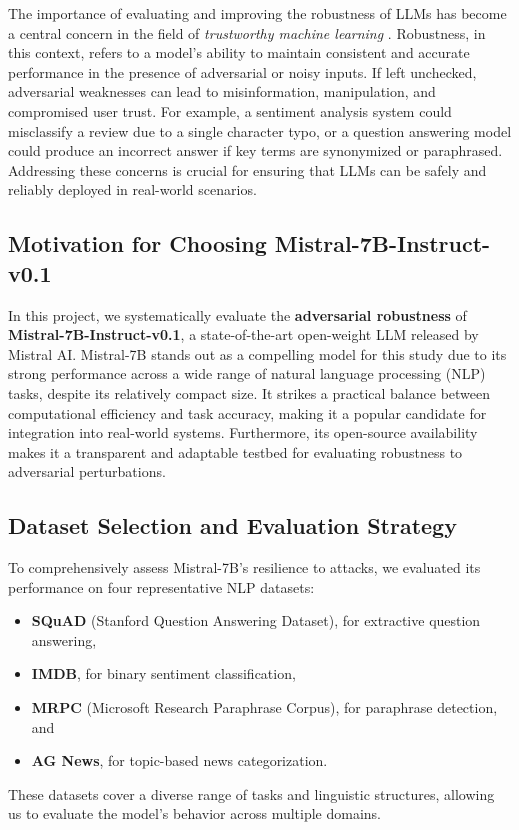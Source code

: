 \documentclass[conference]{IEEEtran}
\begin{document}
The importance of evaluating and improving the robustness of LLMs has become a central concern in the field of \textit{trustworthy machine learning} \cite{vitorino2024}. Robustness, in this context, refers to a model's ability to maintain consistent and accurate performance in the presence of adversarial or noisy inputs. If left unchecked, adversarial weaknesses can lead to misinformation, manipulation, and compromised user trust. For example, a sentiment analysis system could misclassify a review due to a single character typo, or a question answering model could produce an incorrect answer if key terms are synonymized or paraphrased. Addressing these concerns is crucial for ensuring that LLMs can be safely and reliably deployed in real-world scenarios.

\subsection{ Motivation for Choosing Mistral-7B-Instruct-v0.1}

In this project, we systematically evaluate the \textbf{adversarial robustness} of \textbf{Mistral-7B-Instruct-v0.1}, a state-of-the-art open-weight LLM released by Mistral AI. Mistral-7B stands out as a compelling model for this study due to its strong performance across a wide range of natural language processing (NLP) tasks, despite its relatively compact size. It strikes a practical balance between computational efficiency and task accuracy, making it a popular candidate for integration into real-world systems. Furthermore, its open-source availability makes it a transparent and adaptable testbed for evaluating robustness to adversarial perturbations.

\subsection{Dataset Selection and Evaluation Strategy}

To comprehensively assess Mistral-7B's resilience to attacks, we evaluated its performance on four representative NLP datasets:
\begin{itemize}
    \item \textbf{SQuAD} (Stanford Question Answering Dataset), for extractive question answering,
    \item \textbf{IMDB}, for binary sentiment classification,
    \item \textbf{MRPC} (Microsoft Research Paraphrase Corpus), for paraphrase detection, and
    \item \textbf{AG News}, for topic-based news categorization.
\end{itemize}
These datasets cover a diverse range of tasks and linguistic structures, allowing us to evaluate the model's behavior across multiple domains.
\end{document}

